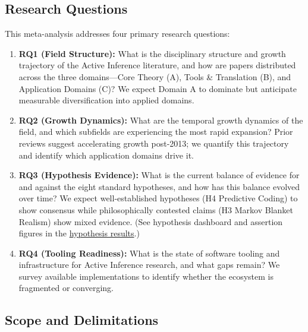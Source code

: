 \documentclass[
  english,
]{article}
\providecommand{\tightlist}{%
  \setlength{\itemsep}{0pt}\setlength{\parskip}{0pt}}
\begin{document}
\subsection{Research Questions}\label{research-questions}

This meta-analysis addresses four primary research questions:

\begin{enumerate}
\def\labelenumi{\arabic{enumi}.}
\tightlist
\item
  \textbf{RQ1 (Field Structure):} What is the disciplinary structure and
  growth trajectory of the Active Inference literature, and how are
  papers distributed across the three domains---Core Theory (A), Tools
  \& Translation (B), and Application Domains (C)? We expect Domain A to
  dominate but anticipate measurable diversification into applied
  domains.
\item
  \textbf{RQ2 (Growth Dynamics):} What are the temporal growth dynamics
  of the field, and which subfields are experiencing the most rapid
  expansion? Prior reviews suggest accelerating growth post-2013; we
  quantify this trajectory and identify which application domains drive
  it.
\item
  \textbf{RQ3 (Hypothesis Evidence):} What is the current balance of
  evidence for and against the eight standard hypotheses, and how has
  this balance evolved over time? We expect well-established hypotheses
  (H4 Predictive Coding) to show consensus while philosophically
  contested claims (H3 Markov Blanket Realism) show mixed evidence. (See
  hypothesis dashboard and assertion figures in the
  \hyperref[sec:hypothesis_results]{hypothesis results}.)
\item
  \textbf{RQ4 (Tooling Readiness):} What is the state of software
  tooling and infrastructure for Active Inference research, and what
  gaps remain? We survey available implementations to identify whether
  the ecosystem is fragmented or converging.
\end{enumerate}

\subsection{Scope and Delimitations}\label{scope-and-delimitations}
\end{document}

